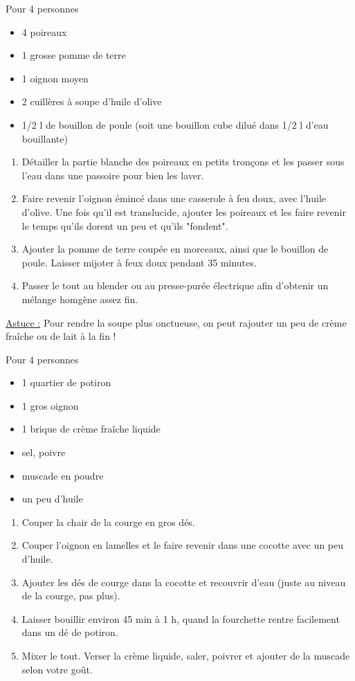 \bigskip
{}
{Pour 4 personnes}{\begin{itemize}
	\item 4 poireaux
	\item 1 grosse pomme de terre
	\item 1 oignon moyen
	\item 2 cuillères à soupe d'huile d'olive
	\item 1/2 l de bouillon de poule (soit une bouillon cube dilué dans 1/2 l d'eau bouillante) 
\end{itemize}}
{\begin{enumerate}
	\item Détailler la partie blanche des poireaux en petits tronçons et les passer sous l'eau dans une passoire pour bien les laver. 
	\item Faire revenir l'oignon émincé dans une casserole à feu doux, avec l'huile d'olive. Une fois qu'il est translucide, ajouter les poireaux et les faire revenir le temps qu'ils dorent un peu et qu'ils "fondent".
	\item Ajouter la pomme de terre coupée en morceaux, ainsi que le bouillon de poule. Laisser mijoter à feux doux pendant 35 minutes.
	\item Passer le tout au blender ou au presse-purée électrique afin d'obtenir un mélange homgène assez fin. 
\end{enumerate}

\underline{Astuce :} Pour rendre la soupe plus onctueuse, on peut rajouter un peu de crème fraîche ou de lait à la fin !}

\bigskip
{}
{Pour 4 personnes}{\begin{itemize}
	\item 1 quartier de potiron
	\item 1 gros oignon
	\item 1 brique de crème fraîche liquide
	\item sel, poivre
	\item muscade en poudre
	\item un peu d'huile
\end{itemize}}
{\begin{enumerate}
	\item Couper la chair de la courge en gros dés.
	\item Couper l'oignon en lamelles et le faire revenir dans une cocotte avec un peu d'huile.
	\item Ajouter les dés de courge dans la cocotte et recouvrir d'eau (juste au niveau de la courge, pas plus).
	\item Laisser bouillir environ 45 min à 1 h, quand la fourchette rentre facilement dans un dé de potiron.
	\item Mixer le tout. Verser la crème liquide, saler, poivrer et ajouter de la muscade selon votre goût. 
\end{enumerate}}


